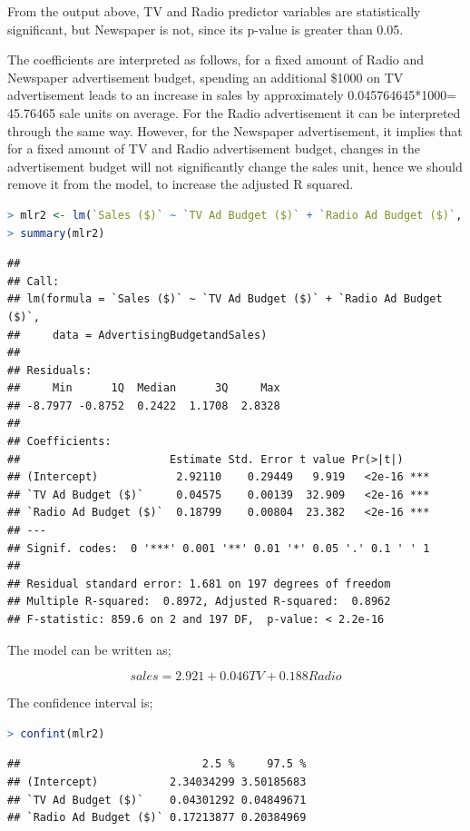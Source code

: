 \documentclass[
]{article}
\begin{document}
From the output above, TV and Radio predictor variables are
statistically significant, but Newspaper is not, since its p-value is
greater than 0.05.

The coefficients are interpreted as follows, for a fixed amount of Radio
and Newspaper advertisement budget, spending an additional \$1000 on TV
advertisement leads to an increase in sales by approximately
0.045764645*1000= 45.76465 sale units on average. For the Radio
advertisement it can be interpreted through the same way. However, for
the Newspaper advertisement, it implies that for a fixed amount of TV
and Radio advertisement budget, changes in the advertisement budget will
not significantly change the sales unit, hence we should remove it from
the model, to increase the adjusted R squared.

\begin{lstlisting}[language=R]
> mlr2 <- lm(`Sales ($)` ~ `TV Ad Budget ($)` + `Radio Ad Budget ($)`, data = AdvertisingBudgetandSales)
> summary(mlr2)
\end{lstlisting}

\begin{lstlisting}
## 
## Call:
## lm(formula = `Sales ($)` ~ `TV Ad Budget ($)` + `Radio Ad Budget ($)`, 
##     data = AdvertisingBudgetandSales)
## 
## Residuals:
##     Min      1Q  Median      3Q     Max 
## -8.7977 -0.8752  0.2422  1.1708  2.8328 
## 
## Coefficients:
##                       Estimate Std. Error t value Pr(>|t|)    
## (Intercept)            2.92110    0.29449   9.919   <2e-16 ***
## `TV Ad Budget ($)`     0.04575    0.00139  32.909   <2e-16 ***
## `Radio Ad Budget ($)`  0.18799    0.00804  23.382   <2e-16 ***
## ---
## Signif. codes:  0 '***' 0.001 '**' 0.01 '*' 0.05 '.' 0.1 ' ' 1
## 
## Residual standard error: 1.681 on 197 degrees of freedom
## Multiple R-squared:  0.8972, Adjusted R-squared:  0.8962 
## F-statistic: 859.6 on 2 and 197 DF,  p-value: < 2.2e-16
\end{lstlisting}

The model can be written as;

\[sales=2.921+0.046TV+0.188Radio\]

The confidence interval is;

\begin{lstlisting}[language=R]
> confint(mlr2)
\end{lstlisting}

\begin{lstlisting}
##                            2.5 %     97.5 %
## (Intercept)           2.34034299 3.50185683
## `TV Ad Budget ($)`    0.04301292 0.04849671
## `Radio Ad Budget ($)` 0.17213877 0.20384969
\end{lstlisting}
\end{document}
